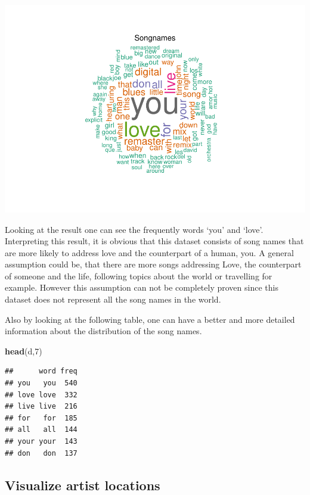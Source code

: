 \documentclass[]{article}
\newenvironment{Shaded}{\begin{snugshade}}{\end{snugshade}}
\newcommand{\KeywordTok}[1]{\textcolor[rgb]{0.13,0.29,0.53}{\textbf{#1}}}
\newcommand{\DecValTok}[1]{\textcolor[rgb]{0.00,0.00,0.81}{#1}}
\newcommand{\NormalTok}[1]{#1}
\begin{document}
\includegraphics{Project2_files/figure-latex/wordcloudSongname-1.pdf}

Looking at the result one can see the frequently words `you' and `love'.
Interpreting this result, it is obvious that this dataset consists of
song names that are more likely to address love and the counterpart of a
human, you. A general assumption could be, that there are more songs
addressing Love, the counterpart of someone and the life, following
topics about the world or travelling for example. However this
assumption can not be completely proven since this dataset does not
represent all the song names in the world.

Also by looking at the following table, one can have a better and more
detailed information about the distribution of the song names.

\begin{Shaded}
\begin{Highlighting}[]
\KeywordTok{head}\NormalTok{(d,}\DecValTok{7}\NormalTok{)}
\end{Highlighting}
\end{Shaded}

\begin{verbatim}
##      word freq
## you   you  540
## love love  332
## live live  216
## for   for  185
## all   all  144
## your your  143
## don   don  137
\end{verbatim}

\subsection{Visualize artist
locations}\label{visualize-artist-locations}
\end{document}
